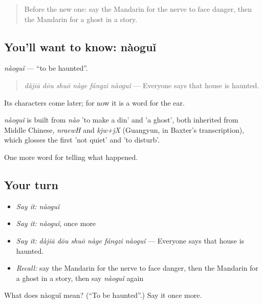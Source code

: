 \label{lesson:ZH-C332-naogui}



\begin{quote}
Before the new one: say the Mandarin for the nerve to face danger, then the Mandarin for a ghost in a story.
\end{quote}

\subsection*{You'll want to know: nàoguǐ}
\emph{nàoguǐ} — \textquotedblleft{}to be haunted\textquotedblright{}.

\begin{quote}
\emph{dàjiā dōu shuō nàge fángzi nàoguǐ} — Everyone says that house is haunted.
\end{quote}

Its characters come later; for now it is a word for the ear.

\begin{cousinweb}
\emph{nàoguǐ} is built from \emph{nào} 'to make a din' and  'a ghost', both inherited from Middle Chinese, \emph{nraewH} and \emph{kjw+jX} (Guangyun, in Baxter's transcription), which glosses the first 'not quiet' and 'to disturb'.
\end{cousinweb}

\begin{grammarlens}[title={What you've built}]
One more word for telling what happened.
\end{grammarlens}

\subsection*{Your turn}
\begin{itemize}
\raggedright
  \item \emph{Say it:} \emph{nàoguǐ}
  \item \emph{Say it:} \emph{nàoguǐ}, once more
  \item \emph{Say it:} \emph{dàjiā dōu shuō nàge fángzi nàoguǐ} — Everyone says that house is haunted.
  \item \emph{Recall:} say the Mandarin for the nerve to face danger, then the Mandarin for a ghost in a story, then say \emph{nàoguǐ} again
\end{itemize}

\begin{tcolorbox}[breakable,colback=teal!4,colframe=teal!35!black,title={Before you move on}]
What does nàoguǐ mean? (\textquotedblleft{}To be haunted\textquotedblright{}.) Say it once more.
\end{tcolorbox}

